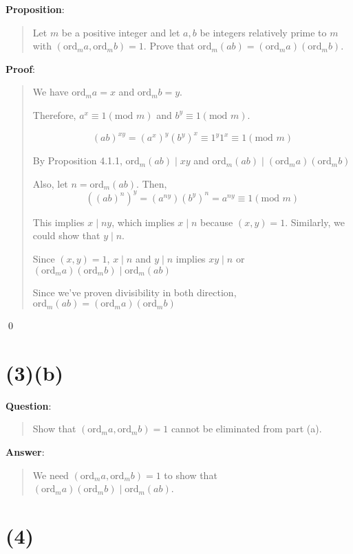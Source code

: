 \documentclass{article} %
\begin{document}
\bigskip
\noindent
\textbf{Proposition}:
\begin{quote}
    Let $m$ be a positive integer and let $a, b$ be integers relatively prime to $m$ with $(\text{ord}_m a, \text{ord}_m b) = 1$. Prove that $\text{ord}_m (ab) = (\text{ord}_m a)(\text{ord}_m b)$.
\end{quote}

\bigskip
\noindent
\textbf{Proof}:
\begin{quote}
    We have $\text{ord}_m a = x$ and $\text{ord}_m b = y$.

    Therefore, $a^x \equiv 1 (\text{mod }m)$ and $b^y \equiv 1(\text{mod }m)$.

    \[(ab)^{xy} = (a^x)^y (b^y)^x \equiv 1^y 1^x \equiv 1 (\text{mod }m)\]

    By Proposition 4.1.1, $\text{ord}_m (ab) \mid xy$ and $\text{ord}_m (ab) \mid (\text{ord}_m a)(\text{ord}_m b)$

    Also, let $n = \text{ord}_m (ab)$. Then,
    \[((ab)^n)^y = (a^{ny})(b^y)^n = a^{ny}\equiv 1 (\text{mod }m)\]

    This implies $x \mid ny$, which implies $x \mid n$ because $(x, y) = 1$. Similarly, we could show that $y \mid n$.

    Since $(x, y) = 1$, $x \mid n$ and $y \mid n$ implies $xy \mid n$ or $(\text{ord}_m a)(\text{ord}_m b) \mid \text{ord}_m (ab)$

    Since we've proven divisibility in both direction, $\text{ord}_m (ab) = (\text{ord}_m a)(\text{ord}_m b)$
\end{quote}
\qed
\bigskip

\section*{(3)(b)}

\bigskip
\noindent
\textbf{Question}:
\begin{quote}
    Show that $(\text{ord}_m a, \text{ord}_m b) = 1$ cannot be eliminated from part (a).
\end{quote}
\bigskip
\noindent
\textbf{Answer}:
\begin{quote}
    We need $(\text{ord}_m a, \text{ord}_m b) = 1$ to show that $(\text{ord}_m a)(\text{ord}_m b) \mid \text{ord}_m (ab)$.
\end{quote}

\bigskip
\section*{(4)}
\end{document}
